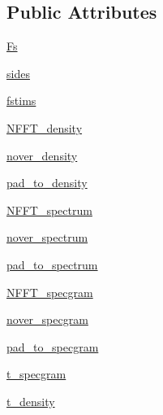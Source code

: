 \subsection*{Public Attributes}
\begin{DoxyCompactItemize}
\item 
\hyperlink{classmatplotlib_1_1tests_1_1test__mlab_1_1TestSpectral_a3a951635c2bffabf976bec9b09814e09}{Fs}
\item 
\hyperlink{classmatplotlib_1_1tests_1_1test__mlab_1_1TestSpectral_aa667437fbbd3fd347707967e23c6fd5a}{sides}
\item 
\hyperlink{classmatplotlib_1_1tests_1_1test__mlab_1_1TestSpectral_ad54522330d900fa91085fda1f8b7f883}{fstims}
\item 
\hyperlink{classmatplotlib_1_1tests_1_1test__mlab_1_1TestSpectral_a6c106f0bf8d06bd7e46b62ef442afc23}{N\+F\+F\+T\+\_\+density}
\item 
\hyperlink{classmatplotlib_1_1tests_1_1test__mlab_1_1TestSpectral_a41f367a74893cc2fdc90a6ace9833b5c}{nover\+\_\+density}
\item 
\hyperlink{classmatplotlib_1_1tests_1_1test__mlab_1_1TestSpectral_a3c6983a25874f8b0df459756bd37f021}{pad\+\_\+to\+\_\+density}
\item 
\hyperlink{classmatplotlib_1_1tests_1_1test__mlab_1_1TestSpectral_ad781f595f91471d9d103e2ca0e7bf079}{N\+F\+F\+T\+\_\+spectrum}
\item 
\hyperlink{classmatplotlib_1_1tests_1_1test__mlab_1_1TestSpectral_a0db5e55011f47cbd2d026f238c97e023}{nover\+\_\+spectrum}
\item 
\hyperlink{classmatplotlib_1_1tests_1_1test__mlab_1_1TestSpectral_aca26488f60c6748446bd05c6f910ada6}{pad\+\_\+to\+\_\+spectrum}
\item 
\hyperlink{classmatplotlib_1_1tests_1_1test__mlab_1_1TestSpectral_a7b2c21bab322d9a12b68033afc6bb3ae}{N\+F\+F\+T\+\_\+specgram}
\item 
\hyperlink{classmatplotlib_1_1tests_1_1test__mlab_1_1TestSpectral_a1c7e454f68b3bcf3e9f2bcd9ebe0909d}{nover\+\_\+specgram}
\item 
\hyperlink{classmatplotlib_1_1tests_1_1test__mlab_1_1TestSpectral_ab58d16cb8660f47d140bd0c67e80fc46}{pad\+\_\+to\+\_\+specgram}
\item 
\hyperlink{classmatplotlib_1_1tests_1_1test__mlab_1_1TestSpectral_ae08453bfca5be66e78b48769907b4e65}{t\+\_\+specgram}
\item 
\hyperlink{classmatplotlib_1_1tests_1_1test__mlab_1_1TestSpectral_a7725458f77137b9b8fa21ef0017b394b}{t\+\_\+density}

\end{DoxyCompactItemize}
